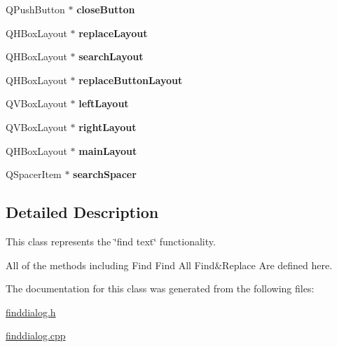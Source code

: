 \begin{DoxyCompactItemize}
\item 
\hypertarget{class_find_dialog_a4cd1160790eb513e0a103ad286fc2510}{}Q\+Push\+Button $\ast$ {\bfseries close\+Button}\label{class_find_dialog_a4cd1160790eb513e0a103ad286fc2510}

\item 
\hypertarget{class_find_dialog_a891b70d2a9b9adeae41b20298e7d23cc}{}Q\+H\+Box\+Layout $\ast$ {\bfseries replace\+Layout}\label{class_find_dialog_a891b70d2a9b9adeae41b20298e7d23cc}

\item 
\hypertarget{class_find_dialog_acebe70639dab551c763cfe19cab7f9ce}{}Q\+H\+Box\+Layout $\ast$ {\bfseries search\+Layout}\label{class_find_dialog_acebe70639dab551c763cfe19cab7f9ce}

\item 
\hypertarget{class_find_dialog_a130675f44fd1bd0fda090793fdf5bff6}{}Q\+H\+Box\+Layout $\ast$ {\bfseries replace\+Button\+Layout}\label{class_find_dialog_a130675f44fd1bd0fda090793fdf5bff6}

\item 
\hypertarget{class_find_dialog_a735dfeee149248594b8311c234866df7}{}Q\+V\+Box\+Layout $\ast$ {\bfseries left\+Layout}\label{class_find_dialog_a735dfeee149248594b8311c234866df7}

\item 
\hypertarget{class_find_dialog_ab93f0e33031fb7dbe6f55f2de1f364aa}{}Q\+V\+Box\+Layout $\ast$ {\bfseries right\+Layout}\label{class_find_dialog_ab93f0e33031fb7dbe6f55f2de1f364aa}

\item 
\hypertarget{class_find_dialog_aae801e97a136a56b3e936b312837ce07}{}Q\+H\+Box\+Layout $\ast$ {\bfseries main\+Layout}\label{class_find_dialog_aae801e97a136a56b3e936b312837ce07}

\item 
\hypertarget{class_find_dialog_a0d031ef966bb68201131d8360ed502ba}{}Q\+Spacer\+Item $\ast$ {\bfseries search\+Spacer}\label{class_find_dialog_a0d031ef966bb68201131d8360ed502ba}

\end{DoxyCompactItemize}


\subsection{Detailed Description}
This class represents the \char`\"{}find text\char`\"{} functionality. 

All of the methods including Find Find All Find\&Replace Are defined here. 

The documentation for this class was generated from the following files\+:\begin{DoxyCompactItemize}
\item 
\hyperlink{finddialog_8h}{finddialog.\+h}\item 
\hyperlink{finddialog_8cpp}{finddialog.\+cpp}\end{DoxyCompactItemize}
